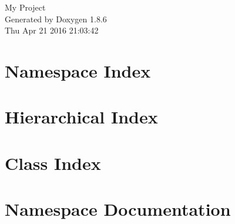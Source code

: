 \documentclass[twoside]{book}
\newcommand{\clearemptydoublepage}{%
  \newpage{\pagestyle{empty}\cleardoublepage}%
}
\begin{document}
\hypersetup{pageanchor=false}
\begin{titlepage}
\vspace*{7cm}
\begin{center}%
{\Large My Project }\\
\vspace*{1cm}
{\large Generated by Doxygen 1.8.6}\\
\vspace*{0.5cm}
{\small Thu Apr 21 2016 21:03:42}\\
\end{center}
\end{titlepage}
\clearemptydoublepage
\tableofcontents
\clearemptydoublepage
{}
\hypersetup{pageanchor=true}

\chapter{Namespace Index}

\chapter{Hierarchical Index}

\chapter{Class Index}

\chapter{Namespace Documentation}

\end{document}
